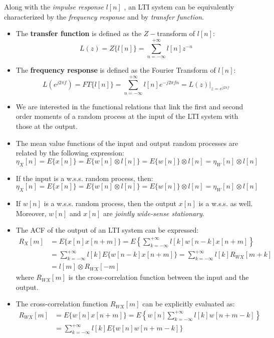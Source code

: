 \noindent Along with the \textit{impulse response} \(l[n]\) , an LTI system can be equivalently characterized by the \textit{frequency response} and by \textit{transfer function}.\\
\begin{itemize}
    \item The \textbf{transfer function} is defined as the \(Z-\)transform of \(l[n]\):
\[
L(z)=Z\{l[n]\}=\sum_{n=-\infty}^{+\infty}l[n]z^{-n}
\]
    \item The \textbf{frequency response} is defined as the Fourier Transform of \(l[n]\):
    \[
    L(e^{j2\pi f})=FT\{l[n]\}=\sum_{n=-\infty}^{+\infty}l[n]e^{-j2\pi f n}=L(z)\Big|_{z=e^{j2\pi f}}
    \]
    \item We are interested in the functional relations that link the first and second order moments of a random process at the input of the LTI system with those at the output.
    \item The mean value functions of the input and output random processes are related by the following expression:
    \[
\eta_X[n] = E\{x[n]\} = E\{w[n] \otimes l[n]\} = E\{w[n]\} \otimes l[n] = \eta_W[n] \otimes l[n]
\]
    \item If the input is a w.s.s. random process, then:
    \[
\eta_X[n] = E\{x[n]\} = E\{w[n] \otimes l[n]\} = E\{w[n]\} \otimes l[n] = \eta_W[n] \otimes l[n]
\]
    \item If \(w[n]\) is a w.s.s. random process, then the output \(x[n]\) is a w.s.s. as well. Moreover, \(w[n]\) and \(x[n]\) are \textit{jointly wide-sense stationary}.
    \item The ACF of the output of an LTI system can be expressed:
    \[
\begin{aligned}
R_X[m] &= E\{x[n] x[n+m]\} = E\left\{ \sum_{k=-\infty}^{+\infty} l[k] w[n-k] x[n+m] \right\} \\
&= \sum_{k=-\infty}^{+\infty} l[k] E\{ w[n-k] x[n+m] \}
= \sum_{k=-\infty}^{+\infty} l[k] R_{WX}[m+k] \\
&= l[m] \otimes R_{WX}[-m]
\end{aligned}
\]
where \(R_{WX}[m]\) is the cross-correlation function between the input and the output.
\item The cross-correlation function \(R_{WX}[m]\) can be explicitly evaluated as:
\[
\begin{aligned}
R_{WX}[m] &= E\{ w[n] x[n+m] \} = E\left\{ w[n] \sum_{k=-\infty}^{+\infty} l[k] w[n+m-k] \right\} \\
&= \sum_{k=-\infty}^{+\infty} l[k] E\{ w[n] w[n+m-k] \}

\end{aligned}\]
\end{itemize}
